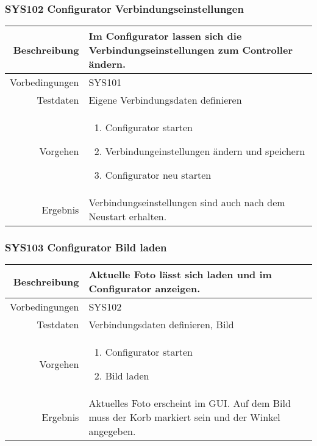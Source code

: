 \subsubsection{SYS102 Configurator Verbindungseinstellungen }
\begin{table}[h!]
	\renewcommand{\arraystretch}{1.5}
	\begin{tabular}{|r|p{14cm}|}
		\hline Beschreibung & Im Configurator lassen sich die Verbindungseinstellungen zum Controller ändern. \\ 
		\hline Vorbedingungen & SYS101 \\ 
		\hline Testdaten & Eigene Verbindungsdaten definieren \\ 
		\hline Vorgehen & 
		\begin{enumerate}
			\item Configurator starten
			\item Verbindungeinstellungen ändern und speichern
			\item Configurator neu starten
		\end{enumerate} \\ 
		\hline Ergebnis & Verbindungseinstellungen sind auch nach dem Neustart erhalten. \\ 
		\hline 
	\end{tabular}
\end{table}

\subsubsection{SYS103 Configurator Bild laden }
\begin{table}[h!]
	\renewcommand{\arraystretch}{1.5}
	\begin{tabular}{|r|p{14cm}|}
		\hline Beschreibung & Aktuelle Foto lässt sich laden und im Configurator anzeigen. \\ 
		\hline Vorbedingungen & SYS102 \\ 
		\hline Testdaten & Verbindungsdaten definieren, Bild \\ 
		\hline Vorgehen & 
		\begin{enumerate}
			\item Configurator starten
			\item Bild laden
		\end{enumerate} \\ 
		\hline Ergebnis & Aktuelles Foto erscheint im GUI. Auf dem Bild muss der Korb markiert sein und der Winkel angegeben. \\ 
		\hline 
	\end{tabular}
\end{table}
\newpage

